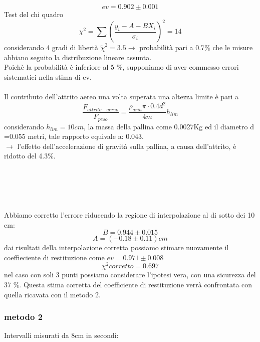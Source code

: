 \documentclass[a4paper]{article}
\theoremstyle{definition}
\begin{document}
\\\\
	 \[ev = 0.902 \pm 0.001\]
	 \noindent Test del chi quadro\\
	 \[\chi ^{2} = \sum \left ( \frac{y_{i}-A-BX_{i}}{\sigma_{i}} \right )^{2} = 14\]
	 \noindent considerando 4 gradi di libertà \(\tilde{\chi}^{2} = 3.5 \rightarrow  \)  probabilità pari a 0.7\(\%\) che le misure abbiano seguito la distribuzione lineare assunta.\\
	 Poichè la probabilità è inferiore al 5 \(\%\), supponiamo di aver commesso errori sistematici nella stima di ev.\\\\
	 Il contributo dell'attrito aereo una volta superata una altezza limite è pari a 
	 \[\frac{F_{attrito \quad aereo}}{F_{peso}} = \frac{\rho_{aria} \pi \cdot 0.4 d^{2}}{4m}h_{lim}\]
	 considerando \(h_{lim} = 10 cm\), la massa della pallina come 0.0027Kg ed il diametro d =0.055 metri, tale rapporto equivale a: 0.043.\\
	 \( \rightarrow \) l'effetto dell'accelerazione di gravità sulla pallina, a causa dell'attrito, è ridotto del 4.3\(\%\).\\\\\\\\\\\\
	 Abbiamo corretto l'errore riducendo la regione di interpolazione al di sotto dei 10 cm:
	 \[B = 0.944 \pm 0.015\]
	 \[A = (-0.18 \pm 0.11) cm\] 
	 dai risultati della interpolazione corretta possiamo stimare nuovamente il coeffieciente di restituzione come \(ev = 0.971 \pm 0.008 \)
	 \[\chi ^{2}corretto = 0.697\]
	 nel caso con soli 3 punti possiamo considerare l'ipotesi vera, con una sicurezza del 37 \(\%\). Questa stima corretta del coefficiente di restituzione verrà confrontata con quella ricavata con il metodo 2.
	\subsubsection*{metodo 2}

	
	\noindent Intervalli misurati da 8cm in secondi:
\end{document}
